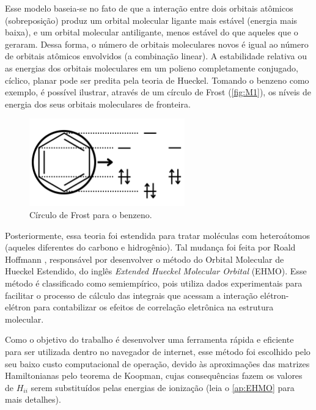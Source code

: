 Esse modelo baseia-se no fato de que a interação entre dois orbitais atômicos (sobreposição) produz um orbital molecular ligante mais estável (energia mais baixa), e um orbital molecular antiligante, menos estável do que aqueles que o geraram. Dessa forma, o número de orbitais moleculares novos é igual ao número de orbitais atômicos envolvidos (a combinação linear). A estabilidade relativa ou as energias dos orbitais moleculares em um polieno completamente conjugado, cíclico, planar pode ser predita pela teoria de Hueckel. Tomando o benzeno como exemplo, é possível ilustrar, através de um círculo de Frost (\autoref{fig:M1}), os níveis de energia dos seus orbitais moleculares de fronteira.

\begin{figure}[htb]
	\caption{\label{fig:M1} Círculo de Frost para o benzeno.}
	\begin{center}
		\includegraphics[width=0.60\textwidth]{images/figM.png}
	\end{center}
\end{figure}


Posteriormente, essa teoria foi estendida para tratar moléculas com heteroátomos (aqueles diferentes do carbono e hidrogênio)\autocite{Liwschitz1963}. Tal mudança foi feita por Roald Hoffmann \autocite{Hoffmann1963}, responsável por desenvolver o método do Orbital Molecular de Hueckel Estendido, do inglês \textit{Extended Hueckel Molecular
Orbital} (\gls{EHMO}). Esse método é classificado como semiempírico, pois utiliza dados experimentais para facilitar o processo de cálculo das integrais que acessam a interação elétron-elétron para contabilizar os efeitos de correlação eletrônica na estrutura molecular.

Como o objetivo do trabalho é desenvolver uma ferramenta rápida e eficiente para ser utilizada dentro no navegador de internet, esse método foi escolhido pelo seu baixo custo computacional de operação, devido às aproximações das matrizes Hamiltonianas pelo teorema de Koopman, cujas consequências fazem os valores de $H_{ii}$ serem substituídos pelas energias de ionização (leia o \autoref{ap:EHMO} para mais detalhes).

